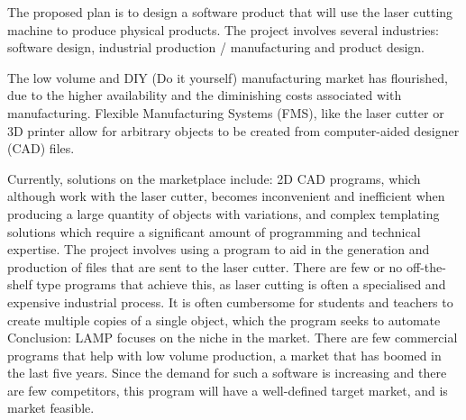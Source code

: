 \documentclass[oneside,openany,11pt,a4paper]{report}
\begin{document}
The proposed plan is to design a software product that will use the laser cutting machine to produce physical products. The project involves several industries: software design, industrial production / manufacturing and product design.

The low volume and DIY (Do it yourself) manufacturing market has flourished, due to the higher availability and the diminishing costs associated with manufacturing. Flexible Manufacturing Systems (FMS), like the laser cutter or 3D printer allow for arbitrary objects to be created from computer-aided designer (CAD) files.

Currently, solutions on the marketplace include: 2D CAD programs, which although work with the laser cutter, becomes inconvenient and inefficient when producing a large quantity of objects with variations, and complex templating solutions which require a significant amount of programming and technical expertise. 
The project involves using a program to aid in the generation and production of files that are sent to the laser cutter. There are few or no off-the-shelf type programs that achieve this, as laser cutting is often a specialised and expensive industrial process. It is often cumbersome for students and teachers to create multiple copies of a single object, which the program seeks to automate
Conclusion:
LAMP focuses on the niche in the market. There are few commercial programs that help with low volume production, a market that has boomed in the last five years. Since the demand for such a software is increasing and there are few competitors, this program will have a well-defined target market, and is market feasible.
\end{document}
